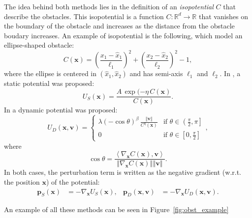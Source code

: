 \documentclass[fleqn, 11pt]{article}
\theoremstyle{definition}
\theoremstyle{plain}
\theoremstyle{remark}
\begin{document}
The idea behind both methods lies in the definition of an \emph{isopotential} $C$ that describe the obstacles.
This isopotential is a function
\( C: \mathbb{R}^d \to \mathbb{R} \)
that vanishes on the boundary of the obstacle and increases as the distance from the obstacle boudary increases.
An example of isopotential is the following, which model an ellipse-shaped obstacle:
\[ C( \mathbf{x} ) = \left( \frac{x_1 - \hat{x}_1}{\ell_1} \right) ^ 2 + \left( \frac{x_2 - \hat{x}_2}{\ell_2} \right) ^ 2 - 1 , \]
where the ellipse is centered in $(\hat{x}_1, \hat{x}_2)$ and has semi-axis $\ell_1$ and $\ell_2$.
In \cite{GMCDSF19}, a static potential was proposed:
\[ U_S ( \mathbf{x} ) = \frac{A\,\exp(-\eta \,C( \mathbf{x} )}{C ( \mathbf{x} ) } . \]
In \cite{GMRSF20} a dynamic potential was proposed:
\[
    U_D( \mathbf{x} , \mathbf{v} ) =
    \begin{cases}
        \lambda (- \cos \theta) ^ \beta \, \frac{ \left\Vert \mathbf{v} \right\Vert  }{ C^\eta ( \mathbf{x} ) }
            & \text{if } \theta \in \left( \frac{\pi}{2}, \pi \right] \\ 
        0
            & \text{if } \theta \in \left[ 0 , \frac{\pi}{2} \right] 
    \end{cases}
    , 
\]
where
\[
\cos \theta = \frac{ \left\langle \nabla_ \mathbf{x} C( \mathbf{x} ) , \mathbf{v} \right\rangle  }{ \left\Vert \nabla_ \mathbf{x} C ( \mathbf{x} ) \right\Vert \left\Vert \mathbf{v} \right\Vert }
.
\]
In both cases, the perturbation term is written as the negative gradient (w.r.t. the position $ \mathbf{x} $) of the potential:
\begin{align*}
    \mathbf{p} _ S ( \mathbf{x} ) & = - \nabla _ \mathbf{x} U_S ( \mathbf{x} ), &
    \mathbf{p} _ D ( \mathbf{x}, \mathbf{v} ) & = - \nabla _ \mathbf{x} U_D ( \mathbf{x}, \mathbf{v} ).
\end{align*}

An example of all these methods can be seen in Figure~\ref{fig:obst_example}
\end{document}
